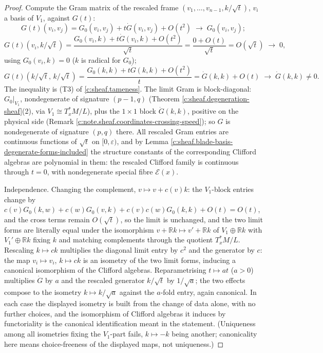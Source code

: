 \documentclass[11pt]{article}
\theoremstyle{definition}
\theoremstyle{plain}
\providecommand{\R}{}\renewcommand{\R}{\mathbb{R}}
\providecommand{\shE}{}\renewcommand{\shE}{\mathcal{E}}
\providecommand{\shL}{}\renewcommand{\shL}{L}
\begin{document}
\begin{proof}
Compute the Gram matrix of the rescaled frame $(v_1, \dots, v_{n-1}, k/\sqrt{t})$, $v_i$ a basis of $V_1$, against $G(t)$:
\[
G(t)(v_i, v_j) = G_0(v_i,v_j) + t\dot G(v_i,v_j) + O(t^2) \;\longrightarrow\; G_0(v_i,v_j) ;
\]
\[
G(t)(v_i, k/\sqrt{t}) = \frac{G_0(v_i,k) + t\dot G(v_i,k) + O(t^2)}{\sqrt{t}} = \frac{0 + O(t)}{\sqrt{t}} = O(\sqrt{t}) \;\longrightarrow\; 0 ,
\]
using $G_0(v_i, k) = 0$ ($k$ is radical for $G_0$);
\[
G(t)(k/\sqrt{t},\, k/\sqrt{t}) = \frac{G_0(k,k) + t\dot G(k,k) + O(t^2)}{t} = \dot G(k,k) + O(t) \;\longrightarrow\; \dot G(k,k) \neq 0 .
\]
The inequality is (T3) of \ref{c:sheaf.tameness}. The limit Gram is block-diagonal: $G_0|_{V_1}$, nondegenerate of signature $(p{-}1,q)$ (Theorem \ref{c:sheaf.degeneration-sheaf}(2), via $V_1 \cong T^*_xM/\shL$), plus the $1 \times 1$ block $\dot G(k,k)$, positive on the physical side (Remark \ref{c:note.sheaf.coordinates-crossing-speed}); so $\hat G$ is nondegenerate of signature $(p,q)$ there. All rescaled Gram entries are continuous functions of $\sqrt{t}$ on $[0, \varepsilon)$, and by Lemma \ref{c:sheaf.blade-basis-degenerate-forms-included} the structure constants of the corresponding Clifford algebras are polynomial in them: the rescaled Clifford family is continuous through $t = 0$, with nondegenerate special fibre $\shE(x)$.

Independence. Changing the complement, $v \mapsto v + c(v)k$: the $V_1$-block entries change by $c(v)G_0(k, w) + c(w)G_0(v,k) + c(v)c(w)G_0(k,k) + O(t) = O(t)$, and the cross terms remain $O(\sqrt t)$, so the limit is unchanged, and the two limit forms are literally equal under the isomorphism $v + \R k \mapsto v' + \R k$ of $V_1 \oplus \R k$ with $V_1' \oplus \R k$ fixing $k$ and matching complements through the quotient $T^*_xM/\shL$. Rescaling $k \mapsto ck$ multiplies the diagonal limit entry by $c^2$ and the generator by $c$: the map $v_i \mapsto v_i$, $k \mapsto ck$ is an isometry of the two limit forms, inducing a canonical isomorphism of the Clifford algebras. Reparametrising $t \mapsto at$ ($a > 0$) multiplies $\dot G$ by $a$ and the rescaled generator $k/\sqrt{t}$ by $1/\sqrt{a}$; the two effects compose to the isometry $k \mapsto k/\sqrt a$ against the $a$-fold entry, again canonical. In each case the displayed isometry is built from the change of data alone, with no further choices, and the isomorphism of Clifford algebras it induces by functoriality is the canonical identification meant in the statement. (Uniqueness among all isometries fixing the $V_1$-part fails, $k \mapsto -k$ being another; canonicality here means choice-freeness of the displayed maps, not uniqueness.)

\end{proof}
\end{document}
